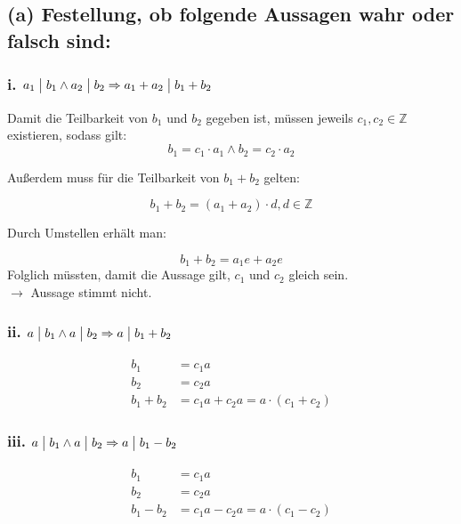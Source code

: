 \documentclass[11pt,a4paper]{article}
\begin{document}
\section{} %

\subsection*{(a) Festellung, ob folgende Aussagen wahr oder falsch sind:}

\subsubsection*{i. $a_1 \bigm| b_1 \wedge a_2 \bigm| b_2 \Rightarrow a_1 + a_2 \bigm| b_1 + b_2$}

Damit die Teilbarkeit von $b_1$ und $b_2$ gegeben ist, müssen jeweils $c_1, c_2 \in \mathbb{Z}$ existieren, sodass gilt:
\begin{equation*}
b_1 = c_1 \cdot a_1 \wedge b_2 = c_2 \cdot a_2
\end{equation*}

Außerdem muss für die Teilbarkeit von $b_1 + b_2$ gelten:

\begin{equation*}
b_1 + b_2 = (a_1 + a_2) \cdot d, d \in \mathbb{Z}
\end{equation*}

Durch Umstellen erhält man:

\begin{equation*}
b_1 + b_2 = a_1e + a_2e
\end{equation*}
Folglich müssten, damit die Aussage gilt, $c_1$ und $c_2$ gleich sein.\\
$\rightarrow$ Aussage stimmt nicht.

\subsubsection*{ii. $a \bigm| b_1 \wedge a \bigm| b_2 \Rightarrow a \bigm| b_1 + b_2$}

\begin{align*}
b_1 &= c_1a\\
b_2 &= c_2a\\
b_1 + b_2 &= c_1a + c_2a = a \cdot (c_1 + c_2) \tag*{\checkmark}
\end{align*}

\subsubsection*{iii. $a \bigm| b_1 \wedge a \bigm| b_2 \Rightarrow a \bigm| b_1 - b_2$}

\begin{align*}
b_1 &= c_1a\\
b_2 &= c_2a\\
b_1 - b_2 &= c_1a - c_2a = a \cdot (c_1 - c_2) \tag*{\checkmark}
\end{align*}
\end{document}

